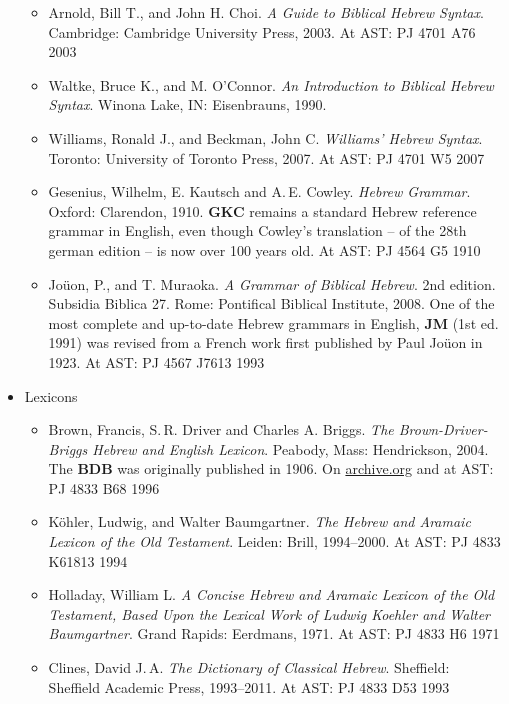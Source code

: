 \documentclass[titlepage]{article}
\begin{document}
\begin{itemize}
    \begin{itemize}
      \item
      	Arnold, Bill T., and John H. Choi. \emph{A Guide to Biblical Hebrew Syntax}.
      	Cambridge: Cambridge University Press, 2003. At AST: PJ 4701 A76 2003
      \item
      	Waltke, Bruce K., and M. O’Connor. \emph{An Introduction to Biblical Hebrew Syntax}.
      	Winona Lake, IN: Eisenbrauns, 1990.
      \item
        Williams, Ronald J., and  Beckman, John C. \emph{Williams' Hebrew Syntax}.
        Toronto: University of Toronto Press, 2007. At AST: PJ 4701 W5 2007
      \item
        Gesenius, Wilhelm, E. Kautsch and A.\,E. Cowley. \emph{Hebrew Grammar}.
        Oxford: Clarendon, 1910. \textbf{GKC} remains a standard Hebrew
        reference grammar in English, even though Cowley's translation
        -- of the 28th german edition -- is now over 100 years old. At
        AST: PJ 4564 G5 1910
      \item
      	Joüon, P., and T. Muraoka. \emph{A Grammar of Biblical Hebrew}.
      	2nd edition. Subsidia Biblica 27. Rome: Pontifical Biblical
      	Institute, 2008. One of the most complete and up-to-date
      	Hebrew grammars in English, \textbf{JM} (1st ed. 1991) was
      	revised from a French work first published by Paul Joüon in
      	1923. At AST: PJ 4567 J7613 1993
    \end{itemize}

  \item Lexicons

    \begin{itemize}
      \item
        Brown, Francis, S.\,R. Driver and Charles A. Briggs. \emph{The
        Brown-Driver-Briggs Hebrew and English Lexicon}. Peabody, Mass:
        Hendrickson, 2004. The \textbf{BDB} was originally published in 1906.
        On \href{https://archive.org/details/hebrewenglishlex00geseuoft}{archive.org}
        and at AST: PJ 4833 B68 1996
      \item
        Köhler, Ludwig, and Walter Baumgartner. \emph{The Hebrew
        and Aramaic Lexicon of the Old Testament}. Leiden: Brill,
        1994--2000.
        At AST: PJ 4833 K61813 1994
      \item
        Holladay, William L. \emph{A Concise Hebrew and Aramaic Lexicon
        of the Old Testament, Based Upon the Lexical Work of Ludwig
        Koehler and Walter Baumgartner}.
        Grand Rapids: Eerdmans, 1971.
        At AST: PJ 4833 H6 1971
      \item
        Clines, David J.\,A. \emph{The Dictionary of Classical Hebrew}.
        Sheffield: Sheffield Academic Press, 1993--2011.
        At AST: PJ 4833 D53 1993
    \end{itemize}

\end{itemize}
\end{document}
